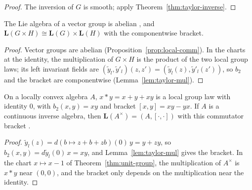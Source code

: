 \begin{proof}
  \leanok
  The inversion of $G$ is smooth; apply Theorem~\ref{thm:taylor-inverse}.
\end{proof}

\begin{proposition}
  \label{prop:prod-lie}
  \leanok
  The Lie algebra of a vector group is abelian \cite[Example 5.1.9(a)]{GN26}, and
  $\mathbf{L}(G \times H) \cong \mathbf{L}(G) \times \mathbf{L}(H)$ with the componentwise bracket.
\end{proposition}

\begin{proof}
  \leanok
  Vector groups are abelian (Proposition~\ref{prop:local-comm}). In the charts at the identity,
  the multiplication of $G \times H$ is the product of the two local group laws; its left
  invariant fields are $(\tilde y_l, \tilde y'_l)(z, z') = (\tilde y_l(z), \tilde y'_l(z'))$, so
  $b_2$ and the bracket are componentwise (Lemma~\ref{lem:taylor-mul}).
\end{proof}

\begin{proposition}
  \label{prop:unit-group-lie}
  \leanok
  On a locally convex algebra $A$, $x * y = x + y + xy$ is a local group law with identity $0$,
  with $b_2(x, y) = xy$ and bracket $[x, y] = xy - yx$. If $A$ is a continuous inverse algebra,
  then $\mathbf{L}(A^\times) = (A, [\cdot, \cdot])$ with this commutator bracket
  \cite[Example 5.1.9(b)]{GN26}.
\end{proposition}

\begin{proof}
  \leanok
  $\tilde y_l(z) = d(b \mapsto z + b + zb)(0)\,y = y + zy$, so $b_2(x, y) = d\tilde y_l(0)\,x = xy$,
  and Lemma~\ref{lem:taylor-mul} gives the bracket. In the chart $x \mapsto x - 1$ of
  Theorem~\ref{thm:unit-group}, the multiplication of $A^\times$ is $x * y$ near $(0, 0)$, and the
  bracket only depends on the multiplication near the identity.
\end{proof}

